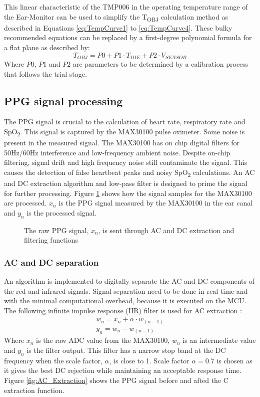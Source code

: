 This linear characteristic of the TMP006 in the operating temperature range of the Ear-Monitor can be used to simplify the T\textsubscript{OBJ} calculation method as described in Equations \ref{eq:TempCurve1} to \ref{eq:TempCurve4}. These bulky recommended equations can be replaced by a first-degree polynomial formula for a flat plane as described by:
\begin{equation}
\label{eq:FlatPlane}
T_{OBJ}=P0+P1\cdot T_{DIE}+P2\cdot V_{SENSOR}
\end{equation}
Where $P0$, $P1$ and $P2$ are parameters to be determined by a calibration process that follows the trial stage.

\subsection{PPG signal processing}
The PPG signal is crucial to the calculation of heart rate, respiratory rate and SpO\textsubscript{2}. This signal is captured by the MAX30100 pulse oximeter. Some noise is present in the measured signal. The MAX30100 has on chip digital filters for 50Hz/60Hz interference and low-frequency ambient noise. Despite on-chip filtering, signal drift and high frequency noise still contaminate the signal. This causes the detection of false heartbeat peaks and noisy SpO\textsubscript{2} calculations. An AC and DC extraction algorithm and low-pass filter is designed to prime the signal for further processing. Figure \ref{fig:PPG_Filtering} shows how the signal samples for the MAX30100 are processed.  $x_n$ is the PPG signal measured by the MAX30100 in the ear canal and $y_n$ is the processed signal.

\begin{figure}[H]
\centering
\graphicspath{{figs/}}

\caption{The raw PPG signal, $x_n$, is sent through AC and DC extraction and filtering functions}
\label{fig:PPG_Filtering}
\end{figure}

\subsubsection{AC and DC separation}
An algorithm is implemented to digitally separate the AC and DC components of the red and infrared signals. Signal separation need to be done in real time and with the minimal computational overhead, because it is executed on the MCU. The following infinite impulse response (IIR) filter is used for AC extraction \citep{koblenski2015everyday}:
\begin{align}
\label{eq:AC_Extraction}
w_n= x_n  + \alpha\cdot w_{(n-1)}\\
y_n  = w_n  - w_{(n-1)}
\end{align}
Where $x_n$ is the raw ADC value from the MAX30100, $w_n$ is an intermediate value and $y_n$ is the filter output. This filter has a narrow stop band at the DC frequency when the scale factor,  $\alpha$, is close to 1. Scale factor $\alpha=0.7$ is chosen as it gives the best DC rejection while maintaining an acceptable response time. Figure \ref{fig:AC_Extraction} shows the PPG signal before and afted the C extraction function.


